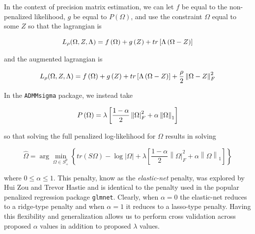 \documentclass[11pt,]{report}
\begin{document}
In the context of precision matrix estimation, we can let \(f\) be equal to the non-penalized likelihood, \(g\) be equal to \(P\left( \Omega \right)\), and use the constraint \(\Omega\) equal to some \(Z\) so that the lagrangian is

\begin{equation}
L_{\rho}(\Omega, Z, \Lambda) = f\left(\Omega\right) + g\left(Z\right) + tr\left[\Lambda\left(\Omega - Z\right)\right]
\label{eq:lagrange2}\notag
\end{equation}

and the augmented lagrangian is

\begin{equation}
L_{\rho}(\Omega, Z, \Lambda) = f\left(\Omega\right) + g\left(Z\right) + tr\left[\Lambda\left(\Omega - Z\right)\right] + \frac{\rho}{2}\left\|\Omega - Z\right\|_{F}^{2}
\label{eq:auglagrange2}\notag
\end{equation}

\vspace{3cm}

In the \texttt{ADMMsigma} package, we instead take

\begin{equation}
P\left( \Omega \right) = \lambda\left[\frac{1 - \alpha}{2}\left\| \Omega \right|_{F}^{2} + \alpha\left\| \Omega \right\|_{1} \right]
\label{eq:penelastic}\notag
\end{equation}

so that solving the full penalized log-likelihood for \(\Omega\) results in solving

\begin{equation}
\hat{\Omega} = \arg\min_{\Omega \in S_{+}^{p}}\left\{ tr\left(S\Omega\right) - \log\left|\Omega \right| + \lambda\left[\frac{1 - \alpha}{2}\left\| \Omega \right|_{F}^{2} + \alpha\left\| \Omega \right\|_{1} \right] \right\}
\label{eq:optimelastic}
\end{equation}

where \(0 \leq \alpha \leq 1\). This penalty, know as the \emph{elastic-net} penalty, was explored by Hui Zou and Trevor Hastie \citep{zou2005regularization} and is identical to the penalty used in the popular penalized regression package \texttt{glmnet}. Clearly, when \(\alpha = 0\) the elastic-net reduces to a ridge-type penalty and when \(\alpha = 1\) it reduces to a lasso-type penalty. Having this flexibility and generalization allows us to perform cross validation across proposed \(\alpha\) values in addition to proposed \(\lambda\) values.
\end{document}
